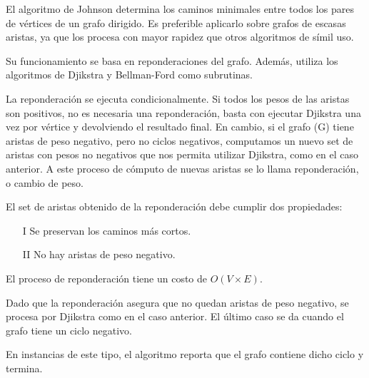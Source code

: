 \documentclass[../tp2_grupo404.tex]{subfiles}
\begin{document}
El algoritmo de Johnson determina los caminos minimales entre todos
los pares de vértices de un grafo dirigido. Es preferible aplicarlo
sobre grafos de escasas aristas, ya que los procesa con mayor
rapidez que otros algoritmos de símil uso.

Su funcionamiento se basa en reponderaciones del grafo. Además,
utiliza los algoritmos de Djikstra y Bellman-Ford como subrutinas.

La reponderación se ejecuta condicionalmente. Si todos los pesos
de las aristas son positivos, no es necesaria una reponderación,
basta con ejecutar Djikstra una vez por vértice y devolviendo el
resultado final. En cambio, si el grafo (G) tiene aristas de peso
negativo, pero no ciclos negativos, computamos un nuevo set de
aristas con pesos no negativos que nos permita utilizar Djikstra,
como en el caso anterior. A este proceso de cómputo de nuevas
aristas se lo llama reponderación, o cambio de peso.

El set de aristas obtenido de la reponderación debe cumplir dos
propiedades:
\begin{enumerate}
    \item[I] Se preservan los caminos más cortos.
    \item[II] No hay aristas de peso negativo.
\end{enumerate}

El proceso de reponderación tiene un costo de $O(V\times E)$.

Dado que la reponderación asegura que no quedan aristas de peso
negativo, se procesa por Djikstra como en el caso anterior.
El último caso se da cuando el grafo tiene un ciclo negativo.

En instancias de este tipo, el algoritmo reporta que el grafo
contiene dicho ciclo y termina.

\end{document}
